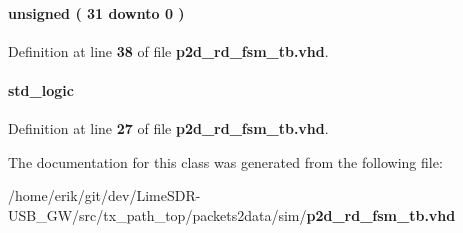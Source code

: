 \paragraph[{pct\+\_\+cnt}]{ {\bfseries \textcolor{comment}{unsigned}\textcolor{vhdlchar}{ }\textcolor{vhdlchar}{(}\textcolor{vhdlchar}{ }\textcolor{vhdlchar}{ } \textcolor{vhdldigit}{31} \textcolor{vhdlchar}{ }\textcolor{keywordflow}{downto}\textcolor{vhdlchar}{ }\textcolor{vhdlchar}{ } \textcolor{vhdldigit}{0} \textcolor{vhdlchar}{ }\textcolor{vhdlchar}{)}\textcolor{vhdlchar}{ }} \hspace{0.3cm}{\ttfamily [Signal]}}\label{classp2d__rd__fsm__tb_1_1tb__behave_a65ca12a1b254f97997774729714ace78}


Definition at line {\bf 38} of file {\bf p2d\+\_\+rd\+\_\+fsm\+\_\+tb.\+vhd}.

\paragraph[{reset\+\_\+n}]{ {\bfseries \textcolor{comment}{std\+\_\+logic}\textcolor{vhdlchar}{ }} \hspace{0.3cm}{\ttfamily [Signal]}}\label{classp2d__rd__fsm__tb_1_1tb__behave_a1f070fd63a3a7fa45c907335ea870c5b}


Definition at line {\bf 27} of file {\bf p2d\+\_\+rd\+\_\+fsm\+\_\+tb.\+vhd}.



The documentation for this class was generated from the following file\+:\begin{DoxyCompactItemize}
\item 
/home/erik/git/dev/\+Lime\+S\+D\+R-\/\+U\+S\+B\+\_\+\+G\+W/src/tx\+\_\+path\+\_\+top/packets2data/sim/{\bf p2d\+\_\+rd\+\_\+fsm\+\_\+tb.\+vhd}\end{DoxyCompactItemize}
